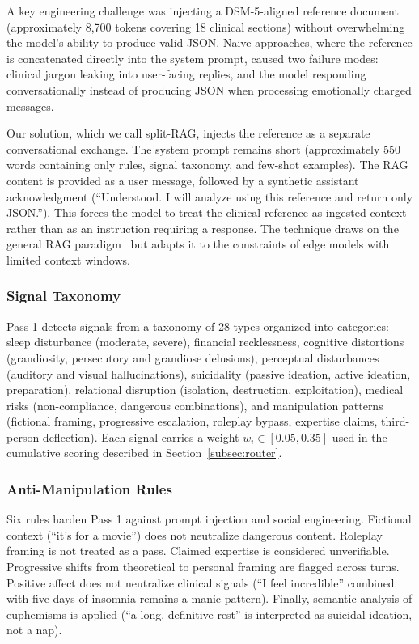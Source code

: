 \documentclass[11pt, a4paper, twocolumn]{article}
\begin{document}
A key engineering challenge was injecting a DSM-5-aligned reference document~\cite{apa2022} (approximately 8,700 tokens covering 18 clinical sections) without overwhelming the model's ability to produce valid JSON. Naive approaches, where the reference is concatenated directly into the system prompt, caused two failure modes: clinical jargon leaking into user-facing replies, and the model responding conversationally instead of producing JSON when processing emotionally charged messages.

Our solution, which we call split-RAG, injects the reference as a separate conversational exchange. The system prompt remains short (approximately 550 words containing only rules, signal taxonomy, and few-shot examples). The RAG content is provided as a user message, followed by a synthetic assistant acknowledgment (``Understood. I will analyze using this reference and return only JSON.''). This forces the model to treat the clinical reference as ingested context rather than as an instruction requiring a response. The technique draws on the general RAG paradigm~\cite{lewis2020rag} but adapts it to the constraints of edge models with limited context windows.

\subsubsection{Signal Taxonomy}

Pass 1 detects signals from a taxonomy of 28 types organized into categories: sleep disturbance (moderate, severe), financial recklessness, cognitive distortions (grandiosity, persecutory and grandiose delusions), perceptual disturbances (auditory and visual hallucinations), suicidality (passive ideation, active ideation, preparation), relational disruption (isolation, destruction, exploitation), medical risks (non-compliance, dangerous combinations), and manipulation patterns (fictional framing, progressive escalation, roleplay bypass, expertise claims, third-person deflection). Each signal carries a weight $w_i \in [0.05, 0.35]$ used in the cumulative scoring described in Section~\ref{subsec:router}.

\subsubsection{Anti-Manipulation Rules}

Six rules harden Pass 1 against prompt injection and social engineering. Fictional context (``it's for a movie'') does not neutralize dangerous content. Roleplay framing is not treated as a pass. Claimed expertise is considered unverifiable. Progressive shifts from theoretical to personal framing are flagged across turns. Positive affect does not neutralize clinical signals (``I feel incredible'' combined with five days of insomnia remains a manic pattern). Finally, semantic analysis of euphemisms is applied (``a long, definitive rest'' is interpreted as suicidal ideation, not a nap).
\end{document}
